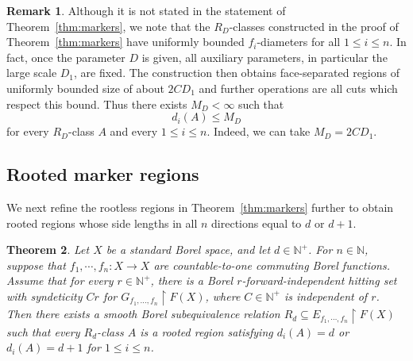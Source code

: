 \documentclass[11pt, reqno, a4paper]{amsart}
\newtheorem{theorem}{Theorem}[section]
\theoremstyle{definition}
\newtheorem{remark}[theorem]{Remark}
\theoremstyle{plain}
\begin{document}





\begin{remark}
\label{rem:uniform-upper-bound}
Although it is not stated in the statement of Theorem~\ref{thm:markers}, we note that the $R_D$-classes constructed in the proof of Theorem~\ref{thm:markers} have uniformly bounded $f_i$-diameters for all $1\leq i\leq n$. In fact, once the parameter $D$ is given,  all auxiliary parameters, in particular the large scale $D_1$, are fixed. The construction then obtains face-separated regions of uniformly bounded size of about $2CD_1$ and further operations are all cuts which respect this bound. Thus there exists $M_D<\infty$ such that
$$
d_i(A)\le M_D
$$
for every $R_D$-class $A$ and every $1\le i\le n$. Indeed, we can take $M_D=2CD_1$.
\end{remark}




\subsection{Rooted marker regions}

We next refine the rootless regions in Theorem~\ref{thm:markers} further
to obtain rooted regions whose side lengths in all $n$ directions equal to $d$ or $d+1$.

\begin{theorem}\label{thm:rooted-markers}
    Let $X$ be a standard Borel space, and let $d\in \mathbb{N}^+$. For $n\in \mathbb{N}$, suppose that $f_1,\cdots ,f_n:X\to X$ are countable-to-one commuting Borel functions. Assume that for every $r\in\mathbb N^+$, there is a Borel $r$-forward-independent
hitting set with syndeticity $Cr$ for
$G_{f_1,\ldots,f_n}\upharpoonright F(X)$,
where $C\in\mathbb N^+$ is independent of $r$. Then there exists a smooth Borel subequivalence relation
$R_d\subseteq E_{f_1,\cdots,f_n}\upharpoonright F(X)$
such that every $R_d$-class $A$ is a rooted region satisfying
 $d_i(A)=d$ or $d_i(A)=d+1$ for $1\le i \le n$.
\end{theorem}
\end{document}
